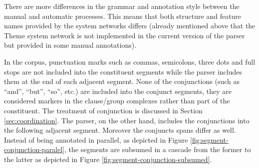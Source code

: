 There are more differences in the grammar and annotation style between the manual and automatic processes. This means that both structure and feature names provided by the system networks differs (already mentioned above that the Theme system network is not implemented in the current version of the parser but provided in some manual annotations). 



In the corpus, punctuation marks such as commas, semicolons, three dots and full stops are not included into the constituent segments while the parser includes them at the end of each adjacent segment. None of the conjunctions (such as ``and'', ``but'', ``so'', etc.) are included into the conjunct segments, they are considered markers in the clause/group complexes rather than part of the constituent. The treatment of conjunction is discussed in Section \ref{sec:coordination}. The parser, on the other hand, includes the conjunctions into the following adjacent segment. Moreover the conjuncts spans differ as well. Instead of being annotated in parallel, as depicted in Figure \ref{fig:segment-conjunction-paralel}, the segments are subsumed in a cascade from the former to the latter as depicted in Figure \ref{fig:segment-conjunction-subsumed}. 

